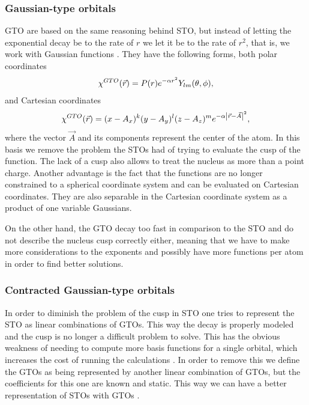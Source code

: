 \documentclass[../Thesis.tex]{subfiles}
\begin{document}
\subsubsection{Gaussian-type orbitals}
\ac{GTO} are based on the same reasoning behind \ac{STO}, but instead of letting
the exponential decay be to the rate of  $r$ we let it be to the rate of $r^2$,
that is, we work with Gaussian functions \cite{ESQCB1P1}.
They have the following
forms, both polar coordinates
\begin{equation}
  \chi^{GTO}(\vec{r}) = P(r)e^{-\alpha r^2}Y_{lm}(\theta, \phi),
\end{equation}
and Cartesian coordinates
\begin{equation}
\chi^{GTO}(\vec{r}) = (x - A_x)^k(y - A_y)^l(z - A_z)^me^{-\alpha\abs{\vec{r} - \vec{A}}^2},
\end{equation}
where the vector $\vec{A}$ and its components represent the center of the atom.
In this basis we remove the problem the \acp{STO} had of trying to evaluate the
cusp of the function. The lack of a cusp also allows to treat the nucleus as
more than a point charge. Another advantage is the fact that the functions are no
longer constrained to a spherical coordinate system and can be evaluated on Cartesian
coordinates. They are also separable in the Cartesian coordinate system as a product of
one variable Gaussians.

On the other hand, the \ac{GTO} decay too fast in comparison to the \ac{STO} and
do not describe the nucleus cusp correctly either, meaning that we have to make
more considerations to the exponents and possibly have more
functions per atom in order to find better solutions.

\subsubsection{Contracted Gaussian-type orbitals}
In order to diminish the problem of the cusp in \ac{STO} one tries to represent the
\ac{STO} as linear combinations of \acp{GTO}. This way the decay is properly modeled and the
cusp is no longer a difficult problem to solve. This has the obvious weakness of needing
to compute more basis functions for a single orbital, which increases the cost of running
the calculations \cite{Cramer:2004}. In order to remove this we define the \acp{GTO}
as being represented by another linear combination of \acp{GTO}, but the coefficients for
this one are known and static. This way we can have a better representation of \acp{STO}
with \acp{GTO} \cite{Jensen:2017}.
\end{document}
